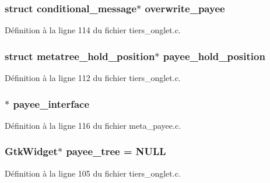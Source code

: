 \subsubsection[{overwrite\_\-payee}]{\setlength{\rightskip}{0pt plus 5cm}struct {\bf conditional\_\-message}$\ast$ {\bf overwrite\_\-payee}}\label{tiers__onglet_8c_a252108aab84c1009beb6363640d12536}


Définition à la ligne 114 du fichier tiers\_\-onglet.c.

\subsubsection[{payee\_\-hold\_\-position}]{\setlength{\rightskip}{0pt plus 5cm}struct {\bf metatree\_\-hold\_\-position}$\ast$ {\bf payee\_\-hold\_\-position}}\label{tiers__onglet_8c_a64408238158197b82c938a98a1543956}


Définition à la ligne 112 du fichier tiers\_\-onglet.c.

\subsubsection[{payee\_\-interface}]{$\ast$ {\bf payee\_\-interface}}\label{tiers__onglet_8c_a2b9ff3d909970141c14d4dd502841f70}


Définition à la ligne 116 du fichier meta\_\-payee.c.

\subsubsection[{payee\_\-tree}]{\setlength{\rightskip}{0pt plus 5cm}GtkWidget$\ast$ {\bf payee\_\-tree} = NULL}\label{tiers__onglet_8c_ab5b539c1af0cb10d03c328f20ecf23bf}


Définition à la ligne 105 du fichier tiers\_\-onglet.c.

